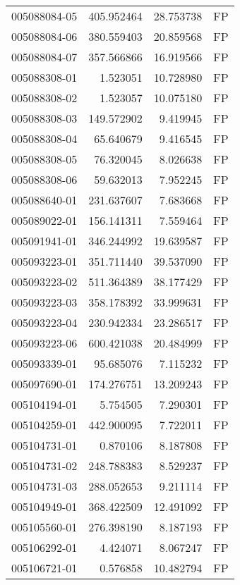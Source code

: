 \begin{tabular}{lrrl}
005088084-05 &  405.952464 &      28.753738 &   FP \\
005088084-06 &  380.559403 &      20.859568 &   FP \\
005088084-07 &  357.566866 &      16.919566 &   FP \\
005088308-01 &    1.523051 &      10.728980 &   FP \\
005088308-02 &    1.523057 &      10.075180 &   FP \\
005088308-03 &  149.572902 &       9.419945 &   FP \\
005088308-04 &   65.640679 &       9.416545 &   FP \\
005088308-05 &   76.320045 &       8.026638 &   FP \\
005088308-06 &   59.632013 &       7.952245 &   FP \\
005088640-01 &  231.637607 &       7.683668 &   FP \\
005089022-01 &  156.141311 &       7.559464 &   FP \\
005091941-01 &  346.244992 &      19.639587 &   FP \\
005093223-01 &  351.711440 &      39.537090 &   FP \\
005093223-02 &  511.364389 &      38.177429 &   FP \\
005093223-03 &  358.178392 &      33.999631 &   FP \\
005093223-04 &  230.942334 &      23.286517 &   FP \\
005093223-06 &  600.421038 &      20.484999 &   FP \\
005093339-01 &   95.685076 &       7.115232 &   FP \\
005097690-01 &  174.276751 &      13.209243 &   FP \\
005104194-01 &    5.754505 &       7.290301 &   FP \\
005104259-01 &  442.900095 &       7.722011 &   FP \\
005104731-01 &    0.870106 &       8.187808 &   FP \\
005104731-02 &  248.788383 &       8.529237 &   FP \\
005104731-03 &  288.052653 &       9.211114 &   FP \\
005104949-01 &  368.422509 &      12.491092 &   FP \\
005105560-01 &  276.398190 &       8.187193 &   FP \\
005106292-01 &    4.424071 &       8.067247 &   FP \\
005106721-01 &    0.576858 &      10.482794 &   FP \\

\end{tabular}
